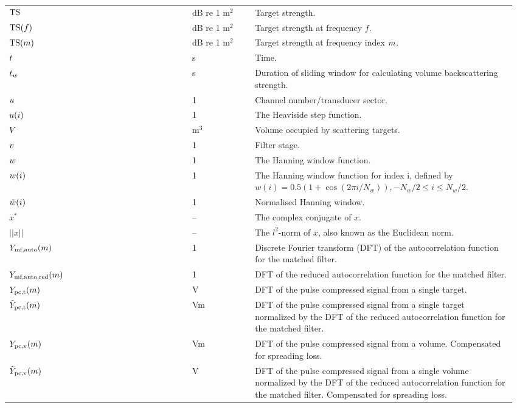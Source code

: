 \documentclass[12pt,a4paper]{article}
\renewcommand{\code}[1]{\texttt{\detokenize{#1}}}
\begin{document}
\begin{longtable}{p{0.15\linewidth} p{0.20\linewidth} p{0.12\linewidth} p{0.5\linewidth} }
$\textrm{TS}$ & & dB re 1 $\textrm{m}^2$ & Target strength.\\
$\textrm{TS}(f)$ & & dB re 1 $\textrm{m}^2$ & Target strength at frequency $f$.\\
$\textrm{TS}(m)$ & \code{TS_m} & dB re 1 $\textrm{m}^{2}$ & Target strength at frequency index $m$.\\

$t$ & & s &  Time.\\
$t_w$ & & s & Duration of sliding window for calculating volume backscattering strength.\\

$u$ & & 1 & Channel number/transducer sector.\\
$u(i)$ & & 1 & The Heaviside step function. \\
$V$ & & $\textrm{m}^3$ & Volume occupied by scattering targets.\\
$v$ & & 1 & Filter stage.\\

$w$ & & 1 & The Hanning window function.\\
$w(i)$ & & 1 & The Hanning window function for index i, defined by $w(i) = 0.5(1+\cos (2\pi i /N_w)), -N_w/2 \leq i \leq N_w/2$.\\
$\tilde{w}(i)$ & & 1 & Normalised Hanning window.\\

$x^*$ & & -- & The complex conjugate of $x$.\\
$||x||$ & & -- & The $l^2$-norm of $x$, also known as the Euclidean norm.\\

$Y_{\textrm{mf,auto}}(m)$ & & 1 & Discrete Fourier transform (DFT) of the autocorrelation function for the matched filter.\\
$Y_{\textrm{mf,auto,red}}(m)$ &  & 1 & DFT of the reduced autocorrelation function for the matched filter.\\
$Y_{\textrm{pc,t}}(m)$ & & V & DFT of the pulse compressed signal from a single target.\\
$\tilde{Y}_{\textrm{pc,t}}(m)$ & & Vm & DFT of the pulse compressed signal from a single target 
normalized by the DFT of the reduced autocorrelation function for the matched filter.\\
$Y_{\textrm{pc,v}}(m)$ & & Vm & DFT of the pulse compressed signal from a volume. Compensated for spreading loss.\\
$\tilde{Y}_{\textrm{pc,v}}(m)$ & & V & DFT of the pulse compressed signal from a single volume normalized by the DFT of the reduced autocorrelation function for the matched filter.  Compensated for spreading loss.\\


\end{longtable}
\end{document}
